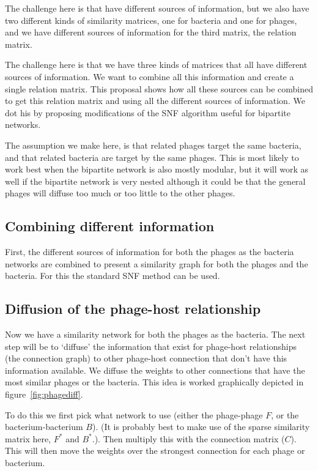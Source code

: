 \documentclass{article}
\begin{document}
The challenge here is that have different sources of information, 
but we also have two different kinds of similarity matrices, one for bacteria
and one for phages, and we have different sources of information for the third
matrix, the relation matrix. 

The challenge here is that we have three kinds of matrices that all have
different sources of information. We want to combine all this information
and create a single relation matrix.
This proposal shows how all these sources can be
combined to get this relation matrix and using all the different sources of information.
We dot his by proposing modifications of the SNF algorithm useful for bipartite networks.

The assumption we make here, is that related phages target the same bacteria, 
and that related bacteria are target by the same phages. This is most likely
to work best when the bipartite network is also mostly modular, but it will
work as well if the bipartite network is very nested although it could be
that the general phages will diffuse too much or too little to the other phages.

\subsection{Combining different information}

First, the different sources of information for both the phages as the bacteria networks
are combined to present a similarity graph for both the phages and the bacteria.
For this the standard SNF method can be used.

\subsection{Diffusion of the phage-host relationship}

Now we have a similarity network for both the phages as the bacteria. 
The next step will be to `diffuse' the information that exist for phage-host 
relationships (the connection graph) 
to other phage-host connection that don't have this information
available.  
We diffuse the weights to other connections that have the most similar phages
or the bacteria. This idea is worked graphically depicted in figure~\ref{fig:phagediff}.

To do this we first pick what network to use (either the phage-phage $F$, or 
the bacterium-bacterium $B$). (It is probably best to make use of the sparse
similarity matrix here, $F^*$ and $B^*$.).
Then multiply this with the connection matrix ($C$). This will then move the
weights over the strongest connection for each phage or bacterium.
\end{document}

